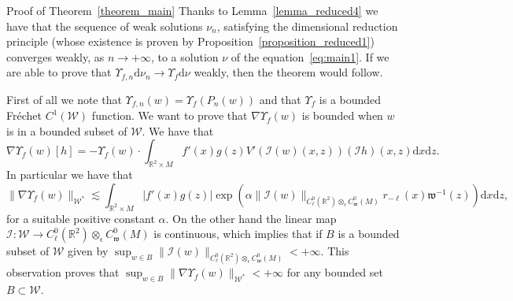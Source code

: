 \documentclass[a4paper,10pt]{article}
\newcommand{\asterisk}{\mathord{*}}
\newcommand{\mathd}{\mathrm{d}}
\newenvironment{proof*}[1]{\noindent\textbf{#1\ }}{\hspace*{\fill}$\Box$\medskip}
\begin{document}
\begin{proof*}{Proof of Theorem~\ref{theorem_main}}
  Thanks to Lemma~\ref{lemma_reduced4} we have that the sequence of weak
  solutions $\nu_n$, satisfying the dimensional reduction principle (whose
  existence is proven by Proposition~\ref{proposition_reduced1}) converges
  weakly, as $n \rightarrow + \infty$, to a solution $\nu$ of the
  equation~{\eqref{eq:main1}}. If we are able to prove that $\Upsilon_{f, n}
   \mathd\nu_n \rightarrow \Upsilon_f  \mathd\nu$ weakly, then the theorem would follow.
  
  First of all we note that $\Upsilon_{f, n} (w) = \Upsilon_f (P_n (w))$ and
  that $\Upsilon_f$ is a bounded Fr{\'e}chet $C^1 (\mathcal{W})$ function. We
  want to prove that $\nabla \Upsilon_f (w)$ is bounded when $w$ is in a
  bounded subset of $\mathcal{W}$. We have that
  \[ \nabla \Upsilon_f (w) [h] = - \Upsilon_f (w) \cdot \int_{\mathbb{R}^2
     \times M} f' (x) g (z) V' (\mathcal{I} (w) (x, z)) (\mathcal{I} h) (x, z)
     \mathd x \mathd z. \]
  In particular we have that
  \[ \| \nabla \Upsilon_f (w) \|_{\mathcal{W}^{\asterisk}} \lesssim
     \int_{\mathbb{R}^2 \times M} | f' (x) g (z) | \exp (\alpha \| \mathcal{I}
     (w) \|_{C^0_{\ell} (\mathbb{R}^2) \otimes_{\epsilon} C^0_{\mathfrak{w}}
     (M)} r_{- \ell} (x) \mathfrak{w}^{- 1} (z)) \mathd x \mathd z, \]
  for a suitable positive constant $\alpha$. On the other hand the linear map
  $\mathcal{I} : \mathcal{W} \rightarrow C^0_{\ell} (\mathbb{R}^2)
  \otimes_{\epsilon} C^0_{\mathfrak{w}} (M)$ is continuous, which implies that
  if $B$ is a bounded subset of $\mathcal{W}$ given by $\sup_{w \in B} \|
  \mathcal{I} (w) \|_{C^0_{\ell} (\mathbb{R}^2) \otimes_{\epsilon}
  C^0_{\mathfrak{w}} (M)} < + \infty$. This observation proves that $\sup_{w
  \in B} \| \nabla \Upsilon_f (w) \|_{\mathcal{W}^{\asterisk}} < + \infty$ for
  any bounded set $B \subset \mathcal{W}$.
  

\end{proof*}
\end{document}
